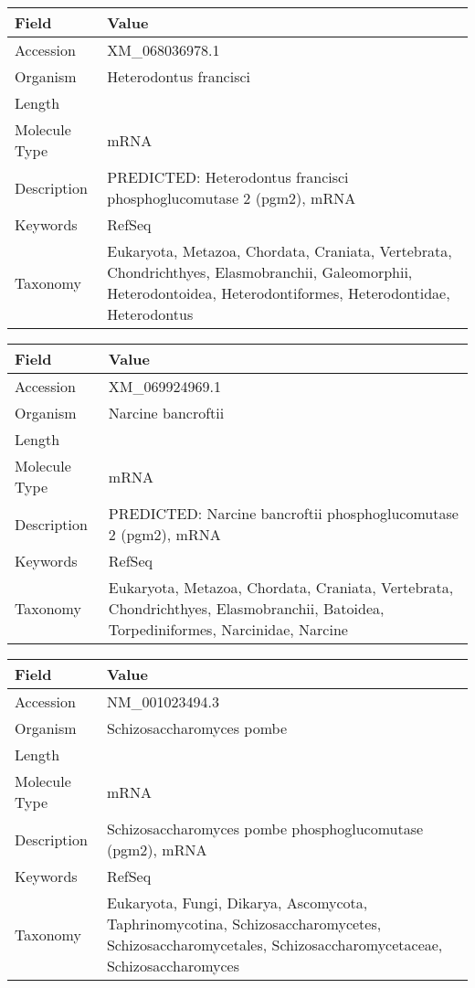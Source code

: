 \documentclass[10pt]{article}
\begin{document}
{\footnotesize
\begin{longtable}{>{\raggedright\arraybackslash}p{4.5cm} >{\raggedright\arraybackslash}p{11.5cm}}
\textbf{Field} & \textbf{Value} \\
\hline
Accession & XM\_068036978.1 \\
Organism & Heterodontus francisci \\
Length & 3704 \\
Molecule Type & mRNA \\
Description & PREDICTED: Heterodontus francisci phosphoglucomutase 2 (pgm2), mRNA \\
Keywords & RefSeq \\
Taxonomy & Eukaryota, Metazoa, Chordata, Craniata, Vertebrata, Chondrichthyes, Elasmobranchii, Galeomorphii, Heterodontoidea, Heterodontiformes, Heterodontidae, Heterodontus \\
\end{longtable}
}

{\footnotesize
\begin{longtable}{>{\raggedright\arraybackslash}p{4.5cm} >{\raggedright\arraybackslash}p{11.5cm}}
\textbf{Field} & \textbf{Value} \\
\hline
Accession & XM\_069924969.1 \\
Organism & Narcine bancroftii \\
Length & 2749 \\
Molecule Type & mRNA \\
Description & PREDICTED: Narcine bancroftii phosphoglucomutase 2 (pgm2), mRNA \\
Keywords & RefSeq \\
Taxonomy & Eukaryota, Metazoa, Chordata, Craniata, Vertebrata, Chondrichthyes, Elasmobranchii, Batoidea, Torpediniformes, Narcinidae, Narcine \\
\end{longtable}
}

{\footnotesize
\begin{longtable}{>{\raggedright\arraybackslash}p{4.5cm} >{\raggedright\arraybackslash}p{11.5cm}}
\textbf{Field} & \textbf{Value} \\
\hline
Accession & NM\_001023494.3 \\
Organism & Schizosaccharomyces pombe \\
Length & 1907 \\
Molecule Type & mRNA \\
Description & Schizosaccharomyces pombe phosphoglucomutase (pgm2), mRNA \\
Keywords & RefSeq \\
Taxonomy & Eukaryota, Fungi, Dikarya, Ascomycota, Taphrinomycotina, Schizosaccharomycetes, Schizosaccharomycetales, Schizosaccharomycetaceae, Schizosaccharomyces \\
\end{longtable}
}
\end{document}
